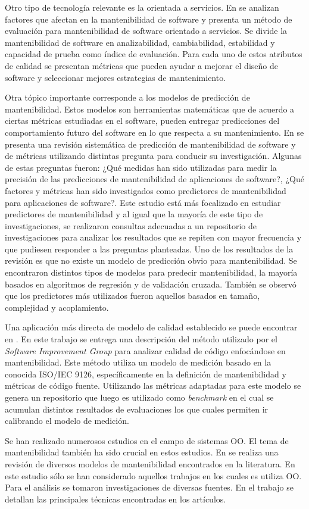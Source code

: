  Otro tipo de tecnología relevante es la orientada a servicios. En
 \cite{ResearchOnMaintainability} se analizan factores que afectan en la mantenibilidad
 de software y presenta un método de evaluación para mantenibilidad de software
 orientado a servicios. Se divide la mantenibilidad de software en analizabilidad,
cambiabilidad, estabilidad y capacidad de prueba como índice de evaluación. Para
cada uno de estos atributos de calidad se presentan métricas que pueden ayudar
a mejorar el diseño de software y seleccionar mejores estrategias de mantenimiento.

Otra tópico importante corresponde a los modelos de predicción de mantenibilidad.
Estos modelos son herramientas matemáticas que de acuerdo a ciertas métricas
estudiadas en el software, pueden entregar predicciones del comportamiento futuro
del software en lo que respecta a su mantenimiento.
En \cite{Riaz:2009} se presenta una revisión sistemática de predicción de mantenibilidad
de software y de métricas utilizando distintas pregunta para conducir su investigación.
Algunas de estas preguntas fueron: ¿Qué medidas han sido utilizadas para
medir la precisión de las predicciones de mantenibilidad de aplicaciones de software?,
¿Qué factores y métricas han sido investigados como predictores de mantenibilidad
para aplicaciones de software?. Este estudio está más focalizado en estudiar
predictores de mantenibilidad y al igual que la mayoría de este tipo de investigaciones,
se realizaron consultas adecuadas a un repositorio de investigaciones para
analizar los resultados que se repiten con mayor frecuencia y que pudiesen responder
a las preguntas planteadas.
Uno de los resultados de la revisión es que no existe un modelo de predicción
obvio para mantenibilidad. Se encontraron distintos tipos de modelos para predecir
mantenibilidad, la mayoría basados en algoritmos de regresión y de validación
cruzada. También se observó que los predictores más utilizados fueron aquellos
basados en tamaño, complejidad y acoplamiento.

Una aplicación más directa de modelo de calidad establecido se puede encontrar en
\cite{Baggen:2012}. En este trabajo se entrega una descripción del método utilizado
por el \textit{Software Improvement Group} para analizar calidad de código 
enfocándose en mantenibilidad. Este método utiliza un modelo de medición
basado en la conocida ISO/IEC 9126, específicamente en la definición de mantenibilidad
y métricas de código fuente. Utilizando las métricas adaptadas para este modelo
se genera un repositorio que luego es utilizado como \textit{benchmark} en
el cual se acumulan distintos resultados de evaluaciones los que cuales permiten
ir calibrando el modelo de medición.

Se han realizado numerosos estudios en el campo de sistemas OO. El tema
de mantenibilidad también ha sido crucial en estos estudios. En \cite{Kumar:2011}
se realiza una revisión de diversos modelos de mantenibilidad 
encontrados en la literatura. En este estudio sólo se han considerado
aquellos trabajos en los cuales es utiliza OO. Para el análisis se
tomaron investigaciones de diversas fuentes. En el trabajo se detallan
las principales técnicas encontradas en los artículos.